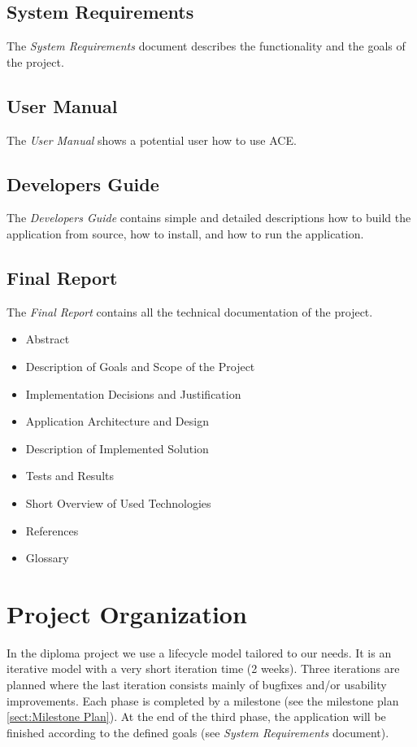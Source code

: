 \documentclass[11pt,a4paper]{article}
\begin{document}
\subsection{System Requirements}
The \emph{System Requirements} document describes the functionality and
the goals of the project.

\subsection{User Manual}
The \emph{User Manual} shows a potential user how to use ACE.

\subsection{Developers Guide}
The \emph{Developers Guide} contains simple and detailed descriptions how
to build the application from source, how to install, and how to run
the application. 

\subsection{Final Report}
The \emph{Final Report} contains all the technical documentation of the project.
\begin{itemize}
 \item Abstract
 \item Description of Goals and Scope of the Project
 \item Implementation Decisions and Justification
 \item Application Architecture and Design
 \item Description of Implemented Solution
 \item Tests and Results
 \item Short Overview of Used Technologies
 \item References
 \item Glossary
\end{itemize}


\section{Project Organization}

In the diploma project we use a lifecycle model tailored to our needs. It is an
iterative model with a very short iteration time (2 weeks). Three iterations 
are planned where the last iteration consists mainly of bugfixes and/or
usability improvements. Each phase is completed by a milestone (see the 
milestone plan \ref{sect:Milestone Plan}). At the end of the third phase, the 
application will be finished according to the defined goals (see
\emph{System Requirements} document).
\end{document}
